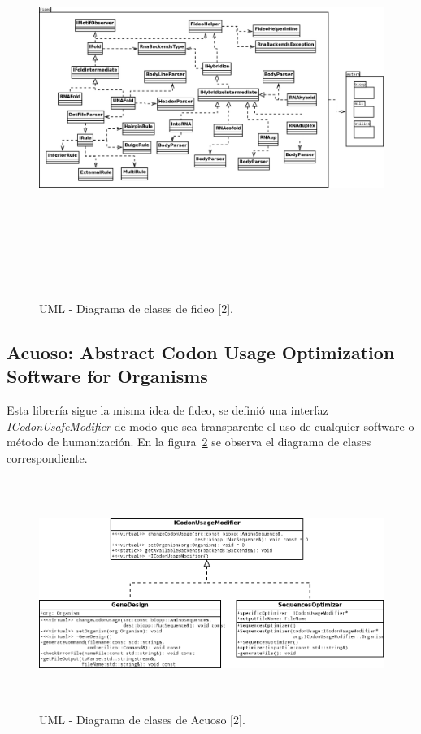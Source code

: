 \begin{figure}[!hbtp]
	\begin{center}
		\includegraphics[width=20.5cm, height=13cm, angle=90]{image/clasesFideo.png}
		\caption{UML - Diagrama de clases de fideo [2].}
		\label{fideitoDisenio1}
	\end{center}
\end{figure}

\vskip 10cm
\subsection{Acuoso: Abstract Codon Usage Optimization Software for Organisms}
Esta librería sigue la misma idea de fideo, se definió una interfaz \emph{ICodonUsafeModifier} de modo que sea transparente el uso de cualquier software o método de humanización. En la figura~\ref{acuosoInterface} se observa el diagrama de clases correspondiente.

\begin{figure}[!hbtp]
	\begin{center}
		\includegraphics[width=15.5cm, height=7.5cm]{image/acuoso.png}
		\caption{UML - Diagrama de clases de Acuoso [2].}
		\label{acuosoInterface}
	\end{center}
\end{figure}

